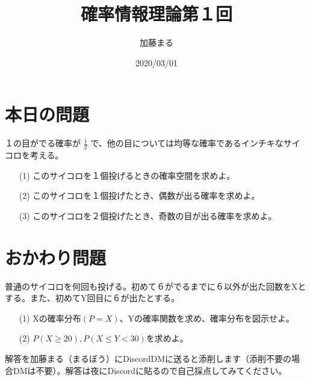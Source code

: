\documentclass[a4j,uplatex]{jsarticle}
\title{確率情報理論第１回}
\author{加藤まる}
\date{2020/03/01}
\begin{document}
\maketitle
\section*{本日の問題}

１の目がでる確率が $\frac{1}{2}$ で、他の目については均等な確率であるインチキなサイコロを考える。
\begin{itemize}
  \item[(1)] このサイコロを１個投げるときの確率空間を求めよ。 
  \item[(2)] このサイコロを１個投げたとき、偶数が出る確率を求めよ。
  \item[(3)] このサイコロを２個投げたとき、奇数の目が出る確率を求めよ。 
\end{itemize}

\section*{おかわり問題}
普通のサイコロを何回も投げる。初めて６がでるまでに６以外が出た回数をXとする。また、初めてY回目に６が出たとする。
\begin{itemize}
  \item[(1)] Xの確率分布$(P=X)$、Yの確率関数を求め、確率分布を図示せよ。
  \item[(2)] $ P(X\ge20) , P(X\le Y<30) $を求めよ。 
\end{itemize}

解答を加藤まる（まるぼう）にDiscordDMに送ると添削します（添削不要の場合DMは不要）。解答は夜にDiscordに貼るので自己採点してみてください。
\end{document}
